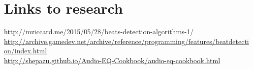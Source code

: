 \documentclass[a4paper]{article}
\begin{document}
    \section{Links to research}
        \url{http://mziccard.me/2015/05/28/beats-detection-algorithms-1/}\\
        \url{http://archive.gamedev.net/archive/reference/programming/features/beatdetection/index.html}\\
        \url{http://shepazu.github.io/Audio-EQ-Cookbook/audio-eq-cookbook.html}\\
        \url{}\\
        \url{}\\
        \url{}\\
\end{document}
